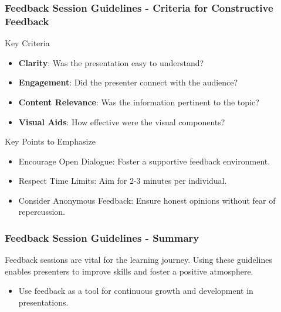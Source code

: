 \documentclass[aspectratio=169]{beamer}
\begin{document}
\begin{frame}[fragile]
    \frametitle{Feedback Session Guidelines - Criteria for Constructive Feedback}
    \begin{block}{Key Criteria}
        \begin{itemize}
            \item \textbf{Clarity}: Was the presentation easy to understand?
            \item \textbf{Engagement}: Did the presenter connect with the audience?
            \item \textbf{Content Relevance}: Was the information pertinent to the topic?
            \item \textbf{Visual Aids}: How effective were the visual components?
        \end{itemize}
    \end{block}
    \begin{block}{Key Points to Emphasize}
        \begin{itemize}
            \item Encourage Open Dialogue: Foster a supportive feedback environment.
            \item Respect Time Limits: Aim for 2-3 minutes per individual.
            \item Consider Anonymous Feedback: Ensure honest opinions without fear of repercussion.
        \end{itemize}
    \end{block}
\end{frame}

\begin{frame}[fragile]
    \frametitle{Feedback Session Guidelines - Summary}
    Feedback sessions are vital for the learning journey. Using these guidelines enables presenters to improve skills and foster a positive atmosphere. 
    \begin{itemize}
        \item Use feedback as a tool for continuous growth and development in presentations.
    \end{itemize}
\end{frame}
\end{document}
